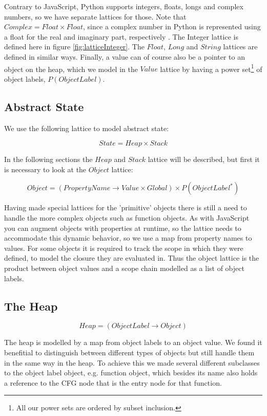 Contrary to JavaScript, Python supports integers, floats, longs and complex numbers, so we have separate lattices for those. Note that $Complex = Float \times Float$, since a complex number in Python is represented using a float for the real and imaginary part, respectively \cite{pyref.stdtypes}. The Integer lattice is defined here in figure \ref{fig:latticeInteger}. The $Float$, $Long$ and $String$ lattices are defined in similar ways. Finally, a value can of course also be a pointer to an object on the heap, which we model in the $Value$ lattice by having a power set\footnote{All our power sets are ordered by subset inclusion.} of object labels, $P(ObjectLabel)$.


\subsection{Abstract State}
We use the following lattice to model abstract state:

\begin{equation*}
State = Heap \times Stack
\end{equation*}

In the following sections the $Heap$ and $Stack$ lattice will be described, but first it is necessary to look at the $Object$ lattice:

\begin{equation*}
Object = (PropertyName \rightarrow Value \times Global) \times P(ObjectLabel^{*})
\end{equation*}

Having made special lattices for the 'primitive' objects there is still a need to handle the more complex objects such as function objects. As with JavaScript you can augment objects with properties at runtime, so the lattice needs to accommodate this dynamic behavior, so we use a map from property names to values. For some objects it is required to track the scope in which they were defined, to model the closure they are evaluated in. Thus the object lattice is the product between object values and a scope chain modelled as a list of object labels.


\subsection{The Heap}
\begin{equation*}
Heap = (ObjectLabel \rightarrow Object)
\end{equation*}

The heap is modelled by a map from object labels to an object value. We found it benefitial to distinguish between different types of objects but still handle them in the same way in the heap. To achieve this we made several different subclasses to the object label object, e.g. function object, which besides its name also holds a reference to the CFG node that is the entry node for that function.


